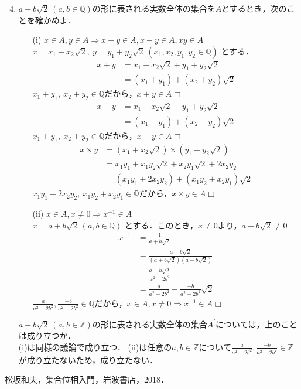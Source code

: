 \documentclass[a4j]{jsarticle}
\def \QED{\hfill $\Box$}%
\begin{document}
\begin{enumerate}
	\setcounter{enumi}{3}
	\item $a+b\sqrt{2}\ (a,b \in \mathbb{Q})$の形に表される実数全体の集合を$A$とするとき，次のことを確かめよ．
	\begin{itemize}
		\item[(i)] $x \in A, y \in A \Rightarrow x + y \in A, x - y \in A, xy \in A$\mbox{}\\
		$x = x_{1}+x_{2}\sqrt{2},\ y = y_{1}+y_{2}\sqrt{2}\ (x_{1}, x_{2}, y_{1}, y_{2} \in \mathbb{Q})$ とする．
		\begin{align}
			x + y &= x_{1}+x_{2}\sqrt{2}+ y_{1}+y_{2}\sqrt{2}\\
				  &= (x_{1}+y_{1})+(x_{2}+y_{2})\sqrt{2}
		\end{align}
		$x_{1}+y_{1},\ x_{2}+y_{2}\in \mathbb{Q}$だから，$x+y \in A$\QED
		\begin{align}
			x - y &= x_{1}+x_{2}\sqrt{2}- y_{1}+y_{2}\sqrt{2}\\
				  &= (x_{1}-y_{1})+(x_{2}-y_{2})\sqrt{2}
		\end{align}
		$x_{1}+y_{1},\ x_{2}+y_{2}\in \mathbb{Q}$だから，$x-y \in A$\QED
		\begin{align}
			x \times y &= (x_{1}+x_{2}\sqrt{2}) \times (y_{1}+y_{2}\sqrt{2})\\
					   &= x_{1}y_{1} + x_{1}y_{2}\sqrt{2} + x_{2}y_{1}\sqrt{2} + 2x_{2}y_{2}\\
					   &= (x_{1}y_{1} + 2x_{2}y_{2}) + (x_{1}y_{2} + x_{2}y_{1})\sqrt{2}
		\end{align}
		$x_{1}y_{1} + 2x_{2}y_{2},\ x_{1}y_{2} + x_{2}y_{1} \in \mathbb{Q}$だから，$x \times y \in A$\QED
		\item[(ii)] $x \in A, x \neq 0 \Rightarrow x^{-1} \in A$ \mbox{}\\
		$x = a+b\sqrt{2}\ (a,b \in \mathbb{Q})$ とする．このとき，$x \neq 0$より，$a + b\sqrt{2} \neq 0$
		\begin{align}
			x^{-1} &= \frac{1}{a+b\sqrt{2}}\\
				   &= \frac{a-b\sqrt{2}}{(a+b\sqrt{2})(a-b\sqrt{2})}\\
				   &= \frac{a-b\sqrt{2}}{a^2-2b^2}\\
				   &= \frac{a}{a^2-2b^2} + \frac{-b}{a^2-2b^2}\sqrt{2}
		\end{align}
		$\frac{a}{a^2-2b^2}, \frac{-b}{a^2-2b^2} \in \mathbb{Q}$だから，$x \in A, x \neq 0 \Rightarrow x^{-1} \in A$\QED
		\medskip
	\end{itemize}
	\item[] $a+b\sqrt{2}\ (a,b \in \mathbb{Z})$の形に表される実数全体の集合$A^{\prime}$については，上のことは成り立つか．\mbox{}\\
	(i)は同様の議論で成り立つ．
	(ii)は任意の$a,b \in \mathbb{Z}$について$\frac{a}{a^2-2b^2}, \frac{-b}{a^2-2b^2} \in \mathbb{Z}$が成り立たないため，成り立たない．
\end{enumerate}


\begin{thebibliography}{99}
松坂和夫，集合位相入門，岩波書店，2018．
\end{thebibliography}
\end{document}
